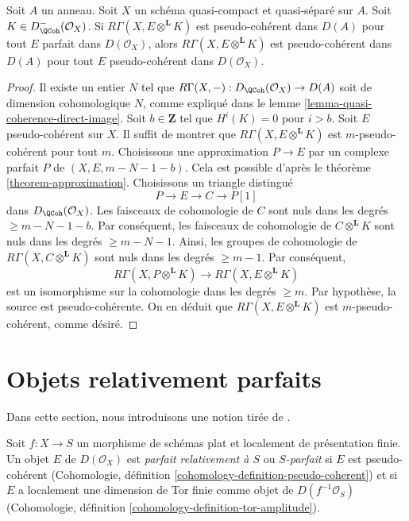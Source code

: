 \begin{lemma}
\label{lemma-perfect-enough}
Soit $A$ un anneau. Soit $X$ un schéma quasi-compact
et quasi-séparé sur $A$. Soit $K \in D^-_\QCoh(\mathcal{O}_X)$.
Si $R\Gamma(X, E \otimes^\mathbf{L} K)$ est pseudo-cohérent
dans $D(A)$ pour tout $E$ parfait dans $D(\mathcal{O}_X)$,
alors $R\Gamma(X, E \otimes^\mathbf{L} K)$ est pseudo-cohérent
dans $D(A)$ pour tout $E$ pseudo-cohérent dans $D(\mathcal{O}_X)$.
\end{lemma}

\begin{proof}
Il existe un entier $N$ tel que
$R\Gamma(X, -) : D_\QCoh(\mathcal{O}_X) \to D(A)$
soit de dimension cohomologique $N$, comme expliqué dans le
lemme \ref{lemma-quasi-coherence-direct-image}.
Soit $b \in \mathbf{Z}$ tel que $H^i(K) = 0$ pour $i > b$.
Soit $E$ pseudo-cohérent sur $X$.
Il suffit de montrer que $R\Gamma(X, E \otimes^\mathbf{L} K)$
est $m$-pseudo-cohérent pour tout $m$.
Choisissons une approximation $P \to E$ par un complexe parfait $P$
de $(X, E, m - N - 1 - b)$. Cela est possible d'après le
théorème \ref{theorem-approximation}.
Choisissons un triangle distingué
$$
P \to E \to C \to P[1]
$$
dans $D_\QCoh(\mathcal{O}_X)$. Les faisceaux de cohomologie de $C$ sont nuls
dans les degrés $\geq m - N - 1 - b$. Par conséquent, les faisceaux de cohomologie
de $C \otimes^\mathbf{L} K$ sont nuls dans les degrés $\geq m - N - 1$.
Ainsi, les groupes de cohomologie de $R\Gamma(X, C \otimes^\mathbf{L} K)$
sont nuls dans les degrés $\geq m - 1$. Par conséquent,
$$
R\Gamma(X, P \otimes^\mathbf{L} K) \to R\Gamma(X, E \otimes^\mathbf{L} K)
$$
est un isomorphisme sur la cohomologie dans les degrés $\geq m$.
Par hypothèse, la source est pseudo-cohérente.
On en déduit que $R\Gamma(X, E \otimes^\mathbf{L} K)$
est $m$-pseudo-cohérent, comme désiré.
\end{proof}









\section{Objets relativement parfaits}
\label{section-relatively-perfect}

\noindent
Dans cette section, nous introduisons une notion tirée de
\cite{lieblich-complexes}.

\begin{definition}
\label{definition-relatively-perfect}
Soit $f : X \to S$ un morphisme de schémas plat et
localement de présentation finie. Un objet $E$ de $D(\mathcal{O}_X)$ est
{\it parfait relativement à $S$} ou
{\it $S$-parfait} si $E$ est pseudo-cohérent
(Cohomologie, définition \ref{cohomology-definition-pseudo-coherent}) et si
$E$ a localement une dimension de Tor finie comme objet de
$D(f^{-1}\mathcal{O}_S)$
(Cohomologie, définition \ref{cohomology-definition-tor-amplitude}).
\end{definition}

